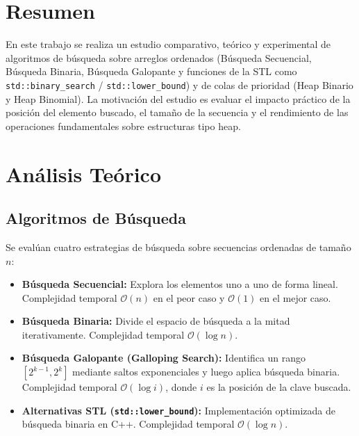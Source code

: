 \documentclass[11pt,a4paper]{article}
\begin{document}
\section{Resumen}
En este trabajo se realiza un estudio comparativo, teórico y experimental de algoritmos de búsqueda sobre arreglos ordenados (Búsqueda Secuencial, Búsqueda Binaria, Búsqueda Galopante y funciones de la STL como \texttt{std::binary\_search} / \texttt{std::lower\_bound}) y de colas de prioridad (Heap Binario y Heap Binomial). La motivación del estudio es evaluar el impacto práctico de la posición del elemento buscado, el tamaño de la secuencia y el rendimiento de las operaciones fundamentales sobre estructuras tipo heap.

\section{Análisis Teórico}

\subsection{Algoritmos de Búsqueda}
Se evalúan cuatro estrategias de búsqueda sobre secuencias ordenadas de tamaño $n$:
\begin{itemize}
    \item \textbf{Búsqueda Secuencial:} Explora los elementos uno a uno de forma lineal. Complejidad temporal $\mathcal{O}(n)$ en el peor caso y $\mathcal{O}(1)$ en el mejor caso.
    \item \textbf{Búsqueda Binaria:} Divide el espacio de búsqueda a la mitad iterativamente. Complejidad temporal $\mathcal{O}(\log n)$.
    \item \textbf{Búsqueda Galopante (Galloping Search):} Identifica un rango $[2^{k-1}, 2^k]$ mediante saltos exponenciales y luego aplica búsqueda binaria. Complejidad temporal $\mathcal{O}(\log i)$, donde $i$ es la posición de la clave buscada.
    \item \textbf{Alternativas STL (\texttt{std::lower\_bound}):} Implementación optimizada de búsqueda binaria en C++. Complejidad temporal $\mathcal{O}(\log n)$.
\end{itemize}
\end{document}
